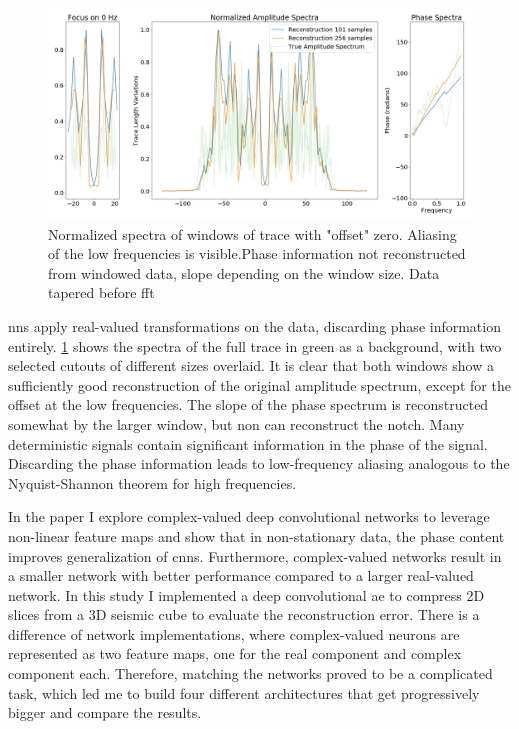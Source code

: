 \begin{figure}
    \centering
    \includegraphics[width=\textwidth]{figures/information-windowing.png}
    \caption{Normalized spectra of windows of trace with "offset" zero. Aliasing of the low frequencies is visible.Phase information not reconstructed from windowed data, slope depending on the window size. Data tapered before \ac{fft} \citep[from][]{dramsch2018information}}
    \label{fig:seismic-window}
\end{figure}

\aclp{nn} apply real-valued transformations on the data, discarding phase information entirely. \cref{fig:seismic-window} shows the spectra of the full trace in green as a background, with two selected cutouts of different sizes overlaid. It is clear that both windows show a sufficiently good reconstruction of the original amplitude spectrum, except for the offset at the low frequencies. The slope of the phase spectrum is reconstructed somewhat by the larger window, but non can reconstruct the notch. Many deterministic signals contain significant information in the phase of the signal. Discarding the phase information leads to low-frequency aliasing analogous to the Nyquist-Shannon theorem for high frequencies.

In the paper  \citep{dramsch2019complex} I explore complex-valued deep convolutional networks to leverage non-linear feature maps and show that in non-stationary data, the phase content improves generalization of \acp{cnn}. Furthermore, complex-valued networks result in a smaller network with better performance compared to a larger real-valued network. In this study I implemented a deep convolutional \acl{ae} to compress 2D slices from a 3D seismic cube to evaluate the reconstruction error. There is a difference of network implementations, where complex-valued neurons are represented as two feature maps, one for the real component and complex component each. Therefore, matching the networks proved to be a complicated task, which led me to build four different architectures that get progressively bigger and compare the results.

